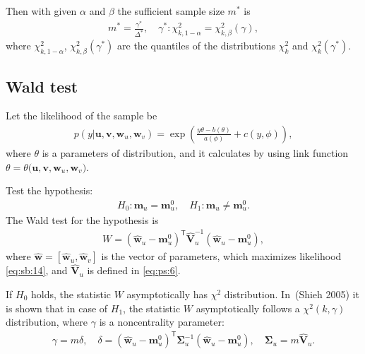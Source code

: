 \documentclass[
11pt,%
tightenlines,%
twoside,%
onecolumn,%
nofloats,%
nobibnotes,%
nofootinbib,%
superscriptaddress,%
noshowpacs,%
centertags]%
{revtex4}
\begin{document}
Then with given $\alpha$ and $\beta$ the sufficient sample size $m^*$ is
\begin{equation}
\label{eq:sb:13}
\begin{aligned}
	m^* = \frac{\gamma^*}{\Delta^*}, \quad \gamma^*:\chi^2_{k, 1-\alpha} = \chi^2_{k, \beta}\left(\gamma\right), 
\end{aligned}
\end{equation}
where $\chi^2_{k, 1-\alpha}$, $\chi^2_{k, \beta}\left(\gamma^*\right)$ are the quantiles of the distributions $\chi^{2}_k$ and $\chi^2_{k}\left(\gamma^*\right)$.
	
\subsection{Wald test}
Let the likelihood of the sample be
\begin{equation}
\label{eq:sb:14}
\begin{aligned}
	p(y|\textbf{u},\textbf{v},\textbf{w}_{u},\textbf{w}_{v}) = \exp\left(\frac{y\theta- b(\theta)}{a(\phi)} + c\left(y, \phi\right)\right),
\end{aligned}
\end{equation}
where $\theta$ is a parameters of distribution, and it calculates by using link function $\theta=\theta\bigr(\textbf{u},\textbf{v},\textbf{w}_{u},\textbf{w}_{v}\bigr)$.

Test the hypothesis:
\begin{equation}
\label{eq:sb:15}
\begin{aligned}
	H_0: \textbf{m}_{u} = \textbf{m}_{u}^{0}, \quad H_1: \textbf{m}_{u} \not=\textbf{m}_{u}^{0}.
\end{aligned}
\end{equation}
The Wald test for the hypothesis is
\begin{equation}
\label{eq:sb:16}
\begin{aligned}
	W = \left(\hat{\textbf{w}}_{u} - \textbf{m}_{u}^{0}\right)^{\mathsf{T}}\hat{\textbf{V}}_{u}^{-1}\left(\hat{\textbf{w}}_{u} - \textbf{m}_{u}^{0}\right),
\end{aligned}
\end{equation}
where $\hat{\textbf{w}} = [\hat{\textbf{w}}_{u},\hat{\textbf{w}}_{v}]$ is the vector of parameters, which maximizes likelihood \eqref{eq:sb:14}, and $\hat{\textbf{V}}_u$ is defined in \eqref{eq:ps:6}.

If $H_0$ holds, the statistic $W$ asymptotically has $\chi^2$ distribution. In~(Shieh 2005) it is shown that in case of $H_1$, the statistic $W$ asymptotically follows a $\chi^2(k,\gamma)$ distribution, where $\gamma$ is a noncentrality parameter:
\begin{equation}
\label{eq:sb:17}
\begin{aligned}
	\gamma = m\delta, \quad \delta = \left(\hat{\textbf{w}}_{u} - \textbf{m}_{u}^{0}\right)^{\mathsf{T}}\bm{\Sigma}^{-1}_u\left(\hat{\textbf{w}}_{u} - \textbf{m}_{u}^{0}\right), \quad \bm{\Sigma}_u = m\hat{\textbf{V}}_u.
\end{aligned}
\end{equation}
\end{document}
